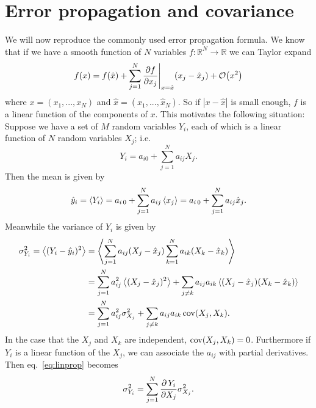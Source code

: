 \section{Error propagation and covariance}\label{sec:prop}
We will now reproduce the commonly used error propagation formula. We know
that if we have a smooth function of $N$ variables 
$f:\mathbb{R}^N\to\mathbb{R}$ we can Taylor expand
\begin{equation}
  f(x)=f(\hat{x})+\sum_{j=1}^N
        \frac{\partial f}{\partial x_j}\Bigg|_{x=\hat{x}}(x_j-\hat{x}_j)
        +\order{x^2}
\end{equation}
where $x=(x_1,...,x_N)$ and $\hat{x}=(\hat{x}_1,...,\hat{x}_N)$. So if 
$|x-\hat{x}|$ is small enough, $f$ is a linear function of the components 
of $x$. This motivates the following situation: Suppose we have a set of 
$M$ random variables $Y_i$, each of which is a linear function of $N$ 
random variables $X_j$; i.e.
\begin{equation}\label{eq:lintran}
  Y_i=a_{i0}+\sum_{j=1}^N a_{ij}X_j.
\end{equation}
Then the mean is given by
\begin{equation}
  \hat{y}_i=\ev{Y_i}=a_{i\,0}+\sum_{j=1}^N a_{ij}\ev{x_j}
           =a_{i\,0}+\sum_{j=1}^N a_{ij}\hat{x}_j.
\end{equation}
Meanwhile the variance of $Y_i$ is given by
\begin{equation}\label{eq:linprop}
  \begin{aligned}
    \sigma^2_{Y_i}=\ev{(Y_i-\hat{y}_i)^2}
              &=\ev{\sum_{j=1}^N a_{ij}(X_j-\hat{x}_j)
                   \sum_{k=1}^N a_{ik}(X_k-\hat{x}_k)}\\
              &=\sum_{j=1}^N a_{ij}^2\ev{(X_j-\hat{x}_j)^2}
               +\sum_{j\neq k}a_{ij}a_{ik}
                \ev{(X_j-\hat{x}_j)(X_k-\hat{x}_k)}\\
              &=\sum_{j=1}^N a_{ij}^2\sigma^2_{X_j}
               +\sum_{j\neq k}a_{ij}a_{ik}\Cov(X_j,X_k).
  \end{aligned}
\end{equation}
In the case that the $X_j$ and $X_k$ are independent, $\operatorname{cov}(X_j,X_k)=0$.
Furthermore if $Y_i$ is a linear function of the $X_j$, we 
can associate the $a_{ij}$ with partial derivatives. Then 
eq.~\eqref{eq:linprop} becomes
\begin{equation}\label{eq:errprop}\index{error propagation formula}
  \sigma^2_{Y_i}=
   \sum_{j=1}^N\frac{\partial\,Y_i}{\partial X_j}\sigma_{X_j}^2.
\end{equation}
